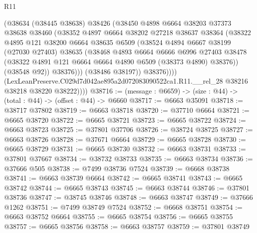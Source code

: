 \begin{lexlean}{R11}
\begin{coremodule}
                  (@38634
                    (@38445 @38638)
                    @38426
                    (@38450
                      @4898
                      @6664
                      @38203
                      @37373
                      @38638
                      @38460
                      (@38352
                        @4897
                        @6664
                        @38202
                        @27218
                        @38637
                        @38364
                        (@38322
                          @4895
                          @121
                          @38200
                          @6664
                          @38635
                          @6509
                          (@38524
                            @4894
                            @6667
                            @38199
                            (@27030 @27403)
                            @38635
                            (@38468
                              @4893
                              @6664
                              @6666
                              @6996
                              @27403
                              @38478
                              (@38322 @4891 @121 @6664 @6664 @4890 @6509 (@38373 @4890) @38376))
                            (@38548 @92))
                          @38376)))
                    (@38486 @38197))
                  @38376))))
          (LexLeanPreserve.C029d7d042ae895a2d072083090522ca1.R11.__rel_28
            @38216
            @38218
            @38220
            @38222))))
@38716 := (message : @6659) -> (size : @44) -> (total : @44) -> (offset : @44) -> @6660
@38717 := @6663 @35091
@38718 := @38717 @37802
@38719 := @6663 @38718
@38720 := @37710 @6664
@38721 := @6665 @38720
@38722 := @6665 @38721
@38723 := @6665 @38722
@38724 := @6663 @38723
@38725 := @37801 @37706
@38726 := @38724 @38725
@38727 := @6663 @38726
@38728 := @37671 @6664
@38729 := @6665 @38728
@38730 := @6665 @38729
@38731 := @6665 @38730
@38732 := @6663 @38731
@38733 := @37801 @37667
@38734 := @38732 @38733
@38735 := @6663 @38734
@38736 := @37666 @505
@38738 := @7499 @38736 @7524
@38739 := @6668 @38738
@38741 := @6663 @38739 @6664
@38742 := @6665 @38741
@38743 := @6665 @38742
@38744 := @6665 @38743
@38745 := @6663 @38744
@38746 := @37801 @38736
@38747 := @38745 @38746
@38748 := @6663 @38747
@38749 := @37666 @1262
@38751 := @7499 @38749 @7524
@38752 := @6668 @38751
@38754 := @6663 @38752 @6664
@38755 := @6665 @38754
@38756 := @6665 @38755
@38757 := @6665 @38756
@38758 := @6663 @38757
@38759 := @37801 @38749

\end{coremodule}
\end{lexlean}
